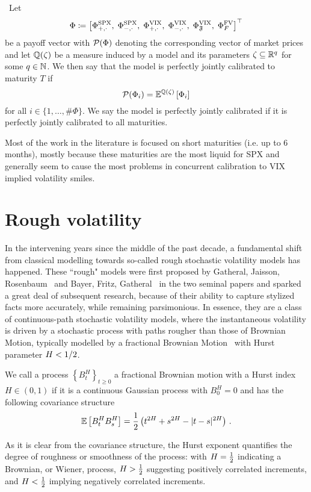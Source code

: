 \begin{definition}\label{def:perfectcalibration}\
Let 
$$\Phi \coloneqq \left[\Phi_{+,\cdot}^{\mathrm{SPX}},\; \Phi_{-,\cdot}^{\mathrm{SPX}},\; \Phi_{+,\cdot}^{\mathrm{VIX}},\; \Phi_{-,\cdot}^{\mathrm{VIX}},\; \Phi_{\mathfrak{F}}^{\mathrm{VIX}},\; \Phi^\textup{FV}_F \right]^\top$$
be a payoff vector with $\mathcal{P}(\Phi)$ denoting the corresponding vector of market prices and let $\mathbb{Q}(\zeta)$ be a measure induced by a model and its parameters $\zeta\subseteq\mathbb{R}^q$ for some $q\in\mathbb{N}$. We then say that the model is perfectly jointly calibrated to maturity $T$ if
\[
\mathcal{P}(\Phi_i) = \mathbb{E}^{\mathbb{Q}(\zeta)}\left[\Phi_i\right]
\]
for all $i\in\{1,\dots,\#\Phi\}$. We say the model is perfectly jointly calibrated if it is perfectly jointly calibrated to all maturities.
\end{definition}

Most of the work in the literature is focused on short maturities (i.e. up to 6 months), mostly because these maturities are the most liquid for SPX and generally seem to cause the most problems in concurrent calibration to VIX implied volatility smiles.


\section{Rough volatility}\label{sec:RoughVolIntro}

In the intervening years since the middle of the past decade, a fundamental shift from classical modelling towards so-called rough stochastic volatility models has happened. These ``rough" models were first proposed by Gatheral, Jaisson, Rosenbaum~\cite{Gatheral2018VolatilityRough} and Bayer, Fritz, Gatheral~\cite{Bayer2015PricingVolatility} in the two seminal papers and sparked a great deal of subsequent research, because of their ability to capture stylized facts more accurately, while remaining parsimonious. In essence, they are a class of continuous-path stochastic volatility models, where the instantaneous volatility is driven by a stochastic process with paths rougher than those of Brownian Motion, typically modelled by a fractional Brownian Motion~\cite{Mandelbrot1968FractionalApplications} with Hurst parameter $H <\nobreak 1/2$.

\begin{definition}\label{def:fBm}
We call a process $\left\{B_t^H\right\}_{t \geq 0}$ a fractional Brownian motion  with a Hurst index $H \in(0,1)$ if it is a continuous Gaussian process with $B_0^H=0$ and has the following covariance structure
\[
\mathbb{E}\left[B_t^H B_s^H\right]=\frac{1}{2}\left(t^{2 H}+s^{2 H}-|t-s|^{2 H}\right)\,.
\]
\end{definition}
As it is clear from the covariance structure, the Hurst exponent quantifies the degree of roughness or smoothness of the process: with $H = \frac{1}{2}$ indicating a Brownian, or Wiener, process, $H > \frac{1}{2}$ suggesting positively correlated increments, and $H < \frac{1}{2}$ implying negatively correlated increments. 

